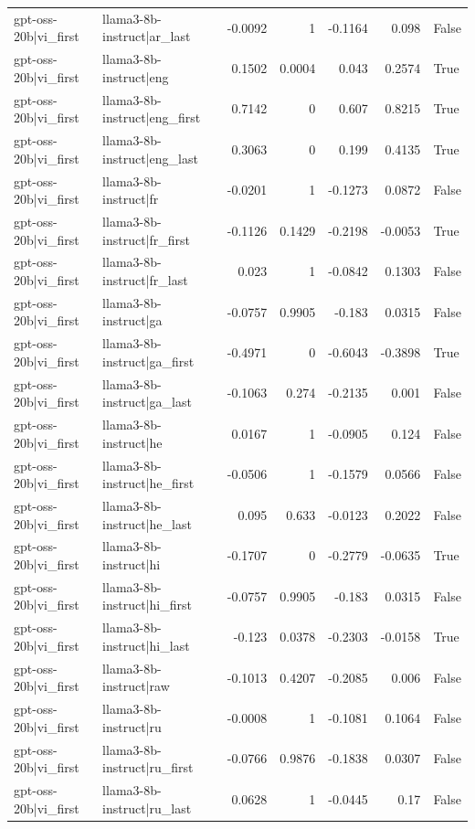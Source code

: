 \begin{table}
\begin{tabular}{l l r r r r l}
gpt-oss-20b|vi_first & llama3-8b-instruct|ar_last & -0.0092 & 1 & -0.1164 & 0.098 & False \\
gpt-oss-20b|vi_first & llama3-8b-instruct|eng & 0.1502 & 0.0004 & 0.043 & 0.2574 & True \\
gpt-oss-20b|vi_first & llama3-8b-instruct|eng_first & 0.7142 & 0 & 0.607 & 0.8215 & True \\
gpt-oss-20b|vi_first & llama3-8b-instruct|eng_last & 0.3063 & 0 & 0.199 & 0.4135 & True \\
gpt-oss-20b|vi_first & llama3-8b-instruct|fr & -0.0201 & 1 & -0.1273 & 0.0872 & False \\
gpt-oss-20b|vi_first & llama3-8b-instruct|fr_first & -0.1126 & 0.1429 & -0.2198 & -0.0053 & True \\
gpt-oss-20b|vi_first & llama3-8b-instruct|fr_last & 0.023 & 1 & -0.0842 & 0.1303 & False \\
gpt-oss-20b|vi_first & llama3-8b-instruct|ga & -0.0757 & 0.9905 & -0.183 & 0.0315 & False \\
gpt-oss-20b|vi_first & llama3-8b-instruct|ga_first & -0.4971 & 0 & -0.6043 & -0.3898 & True \\
gpt-oss-20b|vi_first & llama3-8b-instruct|ga_last & -0.1063 & 0.274 & -0.2135 & 0.001 & False \\
gpt-oss-20b|vi_first & llama3-8b-instruct|he & 0.0167 & 1 & -0.0905 & 0.124 & False \\
gpt-oss-20b|vi_first & llama3-8b-instruct|he_first & -0.0506 & 1 & -0.1579 & 0.0566 & False \\
gpt-oss-20b|vi_first & llama3-8b-instruct|he_last & 0.095 & 0.633 & -0.0123 & 0.2022 & False \\
gpt-oss-20b|vi_first & llama3-8b-instruct|hi & -0.1707 & 0 & -0.2779 & -0.0635 & True \\
gpt-oss-20b|vi_first & llama3-8b-instruct|hi_first & -0.0757 & 0.9905 & -0.183 & 0.0315 & False \\
gpt-oss-20b|vi_first & llama3-8b-instruct|hi_last & -0.123 & 0.0378 & -0.2303 & -0.0158 & True \\
gpt-oss-20b|vi_first & llama3-8b-instruct|raw & -0.1013 & 0.4207 & -0.2085 & 0.006 & False \\
gpt-oss-20b|vi_first & llama3-8b-instruct|ru & -0.0008 & 1 & -0.1081 & 0.1064 & False \\
gpt-oss-20b|vi_first & llama3-8b-instruct|ru_first & -0.0766 & 0.9876 & -0.1838 & 0.0307 & False \\
gpt-oss-20b|vi_first & llama3-8b-instruct|ru_last & 0.0628 & 1 & -0.0445 & 0.17 & False \\

\end{tabular}
\end{table}
